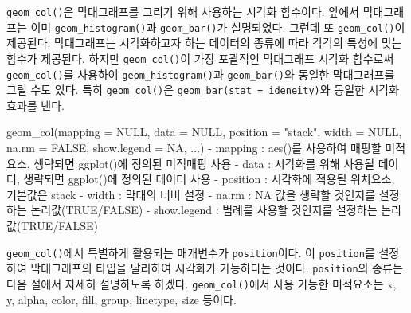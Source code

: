 \documentclass[
]{article}
\newenvironment{Shaded}{\begin{snugshade}}{\end{snugshade}}
\newcommand{\AttributeTok}[1]{\textcolor[rgb]{0.77,0.63,0.00}{#1}}
\newcommand{\ConstantTok}[1]{\textcolor[rgb]{0.00,0.00,0.00}{#1}}
\newcommand{\FunctionTok}[1]{\textcolor[rgb]{0.00,0.00,0.00}{#1}}
\newcommand{\NormalTok}[1]{#1}
\newcommand{\SpecialCharTok}[1]{\textcolor[rgb]{0.00,0.00,0.00}{#1}}
\newcommand{\StringTok}[1]{\textcolor[rgb]{0.31,0.60,0.02}{#1}}
\begin{document}
\texttt{geom\_col()}은 막대그래프를 그리기 위해 사용하는 시각화 함수이다. 앞에서 막대그래프는 이미 \texttt{geom\_histogram()}과 \texttt{geom\_bar()}가 설명되었다. 그런데 또 \texttt{geom\_col()}이 제공된다. 막대그래프는 시각화하고자 하는 데이터의 종류에 따라 각각의 특성에 맞는 함수가 제공된다. 하지만 \texttt{geom\_col()}이 가장 포괄적인 막대그래프 시각화 함수로써 \texttt{geom\_col()}를 사용하여 \texttt{geom\_histogram()}과 \texttt{geom\_bar()}와 동일한 막대그래프를 그릴 수도 있다. 특히 \texttt{geom\_col()}은 \texttt{geom\_bar(stat\ =\ \textquotesingle{}ideneity)}와 동일한 시각화 효과를 낸다.

\begin{Shaded}
\begin{Highlighting}[]
\FunctionTok{geom\_col}\NormalTok{(}\AttributeTok{mapping =} \ConstantTok{NULL}\NormalTok{, }\AttributeTok{data =} \ConstantTok{NULL}\NormalTok{, }\AttributeTok{position =} \StringTok{"stack"}\NormalTok{, }\AttributeTok{width =} \ConstantTok{NULL}\NormalTok{, }\AttributeTok{na.rm =} \ConstantTok{FALSE}\NormalTok{, }\AttributeTok{show.legend =} \ConstantTok{NA}\NormalTok{, ...)}
  \SpecialCharTok{{-}}\NormalTok{ mapping }\SpecialCharTok{:} \FunctionTok{aes}\NormalTok{()를 사용하여 매핑할 미적요소, 생략되면 }\FunctionTok{ggplot}\NormalTok{()에 정의된 미적매핑 사용}
  \SpecialCharTok{{-}}\NormalTok{ data }\SpecialCharTok{:}\NormalTok{ 시각화를 위해 사용될 데이터, 생략되면 }\FunctionTok{ggplot}\NormalTok{()에 정의된 데이터 사용}
  \SpecialCharTok{{-}}\NormalTok{ position }\SpecialCharTok{:}\NormalTok{ 시각화에 적용될 위치요소, 기본값은 }\StringTok{\textquotesingle{}stack\textquotesingle{}}
  \SpecialCharTok{{-}}\NormalTok{ width }\SpecialCharTok{:}\NormalTok{ 막대의 너비 설정}
  \SpecialCharTok{{-}}\NormalTok{ na.rm }\SpecialCharTok{:} \ConstantTok{NA}\NormalTok{ 값을 생략할 것인지를 설정하는 논리값(}\ConstantTok{TRUE}\SpecialCharTok{/}\ConstantTok{FALSE}\NormalTok{)}
  \SpecialCharTok{{-}}\NormalTok{ show.legend }\SpecialCharTok{:}\NormalTok{ 범례를 사용할 것인지를 설정하는 논리값(}\ConstantTok{TRUE}\SpecialCharTok{/}\ConstantTok{FALSE}\NormalTok{) }
\end{Highlighting}
\end{Shaded}

\texttt{geom\_col()}에서 특별하게 활용되는 매개변수가 \texttt{position}이다. 이 \texttt{position}를 설정하여 막대그래프의 타입을 달리하여 시각화가 가능하다는 것이다. \texttt{position}의 종류는 다음 절에서 자세히 설명하도록 하겠다. \texttt{geom\_col()}에서 사용 가능한 미적요소는 x, y, alpha, color, fill, group, linetype, size 등이다.
\end{document}
